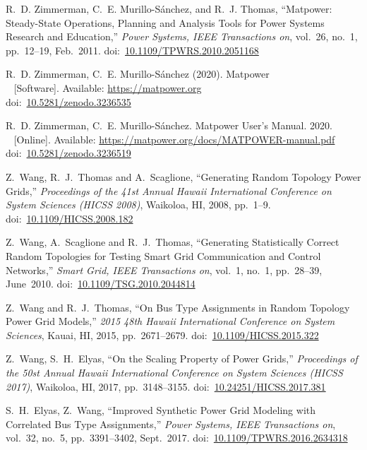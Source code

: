 \documentclass[12pt]{article}
\newcommand{\matpower}[0]{{\sc Matpower}}
\newcommand{\doi}[1]{doi:~\href{https://doi.org/#1}{#1}}
\numberwithin{equation}{section}
\numberwithin{table}{section}
\numberwithin{figure}{section}
\begin{document}
\clearpage
\begin{thebibliography}{99}

R.~D. Zimmerman, C.~E. Murillo-S{\'a}nchez, and R.~J. Thomas, ``\matpower{}: Steady-State Operations, Planning and Analysis Tools for Power Systems Research and Education,'' \emph{Power Systems, IEEE Transactions on}, vol.~26, no.~1, pp.~12--19, Feb.~2011. \doi{10.1109/TPWRS.2010.2051168}

R.~D. Zimmerman, C.~E. Murillo-S{\'a}nchez (2020). \matpower{}\\~
[Software]. Available: \url{https://matpower.org}\\
\doi{10.5281/zenodo.3236535}

R.~D. Zimmerman, C.~E. Murillo-S{\'a}nchez. \matpower{} User's Manual. 2020.\\~
[Online]. Available: \url{https://matpower.org/docs/MATPOWER-manual.pdf}\\
\doi{10.5281/zenodo.3236519}

Z.~Wang, R.~J.~Thomas and A.~Scaglione, ``Generating Random Topology Power Grids,'' \emph{Proceedings of the 41st Annual Hawaii International Conference on System Sciences (HICSS 2008)}, Waikoloa, HI, 2008, pp.~1--9.
\doi{10.1109/HICSS.2008.182}

Z.~Wang, A.~Scaglione and R.~J.~Thomas, ``Generating Statistically Correct Random Topologies for Testing Smart Grid Communication and Control Networks,'' \emph{Smart Grid, IEEE Transactions on}, vol.~1, no.~1, pp.~28--39, June~2010.
\doi{10.1109/TSG.2010.2044814}

Z.~Wang and R.~J.~Thomas, ``On Bus Type Assignments in Random Topology Power Grid Models,'' \emph{2015 48th Hawaii International Conference on System Sciences}, Kauai, HI, 2015, pp.~2671--2679.
\doi{10.1109/HICSS.2015.322}

Z.~Wang, S.~H.~Elyas, ``On the Scaling Property of Power Grids,'' \emph{Proceedings of the 50st Annual Hawaii International Conference on System Sciences (HICSS 2017)}, Waikoloa, HI, 2017, pp.~3148--3155.
\doi{10.24251/HICSS.2017.381}

S.~H.~Elyas, Z.~Wang, ``Improved Synthetic Power Grid Modeling with Correlated Bus Type Assignments,'' \emph{Power Systems, IEEE Transactions on}, vol.~32, no.~5, pp.~3391--3402, Sept.~2017.
\doi{10.1109/TPWRS.2016.2634318}


\end{thebibliography}
\end{document}
